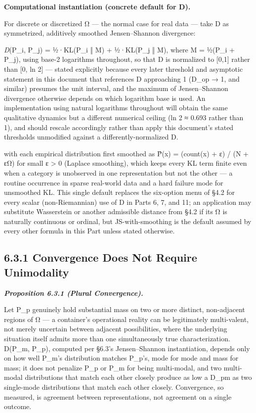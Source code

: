 \documentclass[
]{article}
\begin{document}
\textbf{Computational instantiation (concrete default for D).}

For discrete or discretized Ω --- the normal case for real data --- take
D as symmetrized, additively smoothed Jensen--Shannon divergence:

\emph{D}(P\_i, P\_j) = ½·KL(P\_i ‖ M) + ½·KL(P\_j ‖ M), where M = ½(P\_i
+ P\_j), using base-2 logarithms throughout, so that D is normalized to
{[}0,1{]} rather than {[}0, ln 2{]} --- stated explicitly because every
later threshold and asymptotic statement in this document that
references D approaching 1 (D\_op → 1, and similar) presumes the unit
interval, and the maximum of Jensen--Shannon divergence otherwise
depends on which logarithm base is used. An implementation using natural
logarithms throughout will obtain the same qualitative dynamics but a
different numerical ceiling (ln 2 ≈ 0.693 rather than 1), and should
rescale accordingly rather than apply this document's stated thresholds
unmodified against a differently-normalized D.

with each empirical distribution first smoothed as P̂(x) = (count(x) + ε)
/ (N + εΩ) for small ε \textgreater{} 0 (Laplace smoothing), which keeps
every KL term finite even when a category is unobserved in one
representation but not the other --- a routine occurrence in sparse
real-world data and a hard failure mode for unsmoothed KL. This single
default replaces the six-option menu of §4.2 for every scalar
(non-Riemannian) use of D in Parts 6, 7, and 11; an application may
substitute Wasserstein or another admissible distance from §4.2 if its Ω
is naturally continuous or ordinal, but JS-with-smoothing is the default
assumed by every other formula in this Part unless stated otherwise.

\hypertarget{convergence-does-not-require-unimodality}{%
\subsection{6.3.1 Convergence Does Not Require
Unimodality}\label{convergence-does-not-require-unimodality}}

\emph{\textbf{Proposition 6.3.1 (Plural Convergence).}}

Let P\_p genuinely hold substantial mass on two or more distinct,
non-adjacent regions of Ω --- a container's operational reality can be
legitimately multi-valent, not merely uncertain between adjacent
possibilities, where the underlying situation itself admits more than
one simultaneously true characterization. D(P\_m, P\_p), computed per
§6.3's Jensen--Shannon instantiation, depends only on how well P\_m's
distribution matches P\_p's, mode for mode and mass for mass; it does
not penalize P\_p or P\_m for being multi-modal, and two multi-modal
distributions that match each other closely produce as low a D\_pm as
two single-mode distributions that match each other closely.
Convergence, so measured, is agreement between representations, not
agreement on a single outcome.
\end{document}
